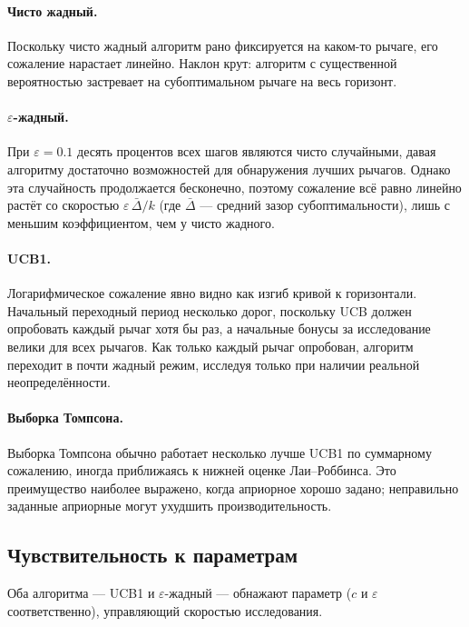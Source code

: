 \paragraph{Чисто жадный.} Поскольку чисто жадный алгоритм рано фиксируется на каком-то рычаге, его сожаление нарастает линейно.  Наклон крут: алгоритм с существенной вероятностью застревает на субоптимальном рычаге на весь горизонт.

\paragraph{$\varepsilon$-жадный.} При $\varepsilon=0.1$ десять процентов всех шагов являются чисто случайными, давая алгоритму достаточно возможностей для обнаружения лучших рычагов.  Однако эта случайность продолжается бесконечно, поэтому сожаление всё равно линейно растёт со скоростью $\varepsilon\,\bar\Delta/k$ (где $\bar\Delta$ — средний зазор субоптимальности), лишь с меньшим коэффициентом, чем у чисто жадного.

\paragraph{UCB1.} Логарифмическое сожаление явно видно как изгиб кривой к горизонтали.  Начальный переходный период несколько дорог, поскольку UCB должен опробовать каждый рычаг хотя бы раз, а начальные бонусы за исследование велики для всех рычагов.  Как только каждый рычаг опробован, алгоритм переходит в почти жадный режим, исследуя только при наличии реальной неопределённости.

\paragraph{Выборка Томпсона.} Выборка Томпсона обычно работает несколько лучше UCB1 по суммарному сожалению, иногда приближаясь к нижней оценке Лаи--Роббинса.  Это преимущество наиболее выражено, когда априорное хорошо задано; неправильно заданные априорные могут ухудшить производительность.

\subsection*{Чувствительность к параметрам}

Оба алгоритма — UCB1 и $\varepsilon$-жадный — обнажают параметр ($c$ и $\varepsilon$ соответственно), управляющий скоростью исследования.

